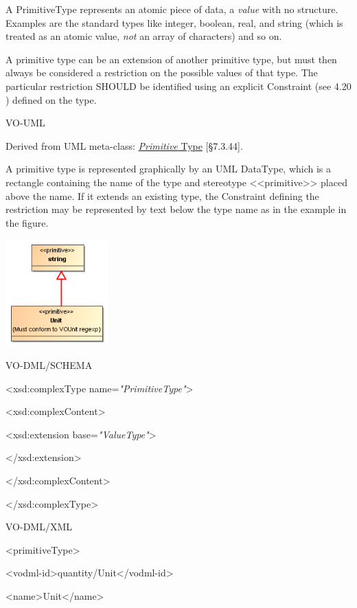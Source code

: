 \documentclass[10pt,a4paper]{ivoa}
\begin{document}
A PrimitiveType represents an atomic piece of data, a \emph{value} with
no structure. Examples are the standard types like integer, boolean,
real, and string (which is treated as an atomic value, \emph{not} an
array of characters) and so on.

A primitive type can be an extension of another primitive type, but must
then always be considered a restriction on the possible values of that
type. The particular restriction SHOULD be identified using an explicit
Constraint (see 4.20 ) defined on the type.

VO-UML

Derived from UML meta-class:
\href{http://www.uml-diagrams.org/class-diagrams.html\#primitive-type}{\emph{Primitive}
Type} {[}§7.3.44{]}.

A primitive type is represented graphically by an UML DataType, which is
a rectangle containing the name of the type and stereotype
\textless\textless primitive\textgreater\textgreater{} placed above the
name. If it extends an existing type, the Constraint defining the
restriction may be represented by text below the type name as in the
example in the figure.

\includegraphics[width=1.55in,height=1.61667in]{./media/image13.png}

VO-DML/SCHEMA

\textless xsd:complexType name=\emph{"PrimitiveType"}\textgreater{}

\textless xsd:complexContent\textgreater{}

\textless xsd:extension base=\emph{"ValueType"}\textgreater{}

\textless/xsd:extension\textgreater{}

\textless/xsd:complexContent\textgreater{}

\textless/xsd:complexType\textgreater{}

VO-DML/XML

\textless primitiveType\textgreater{}

\textless vodml-id\textgreater quantity/Unit\textless/vodml-id\textgreater{}

\textless name\textgreater Unit\textless/name\textgreater{}
\end{document}
